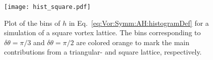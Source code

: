 \begin{figure}[hb]
    \centering
    \texttt{[image: hist\_square.pdf]}
    \caption{Plot of the bins of $h$ in Eq.~\eqref{eq:Vor:Symm:AH:histogramDef} for a simulation of a square vortex lattice.
    The bins corresponding to $\delta\theta = \pi/3$ and $\delta\theta = \pi/2$ are colored orange to mark the main contributions from
    a triangular- and square lattice, respectively.}
    \label{fig:Vor:Symm:AH:histogram}
\end{figure}


